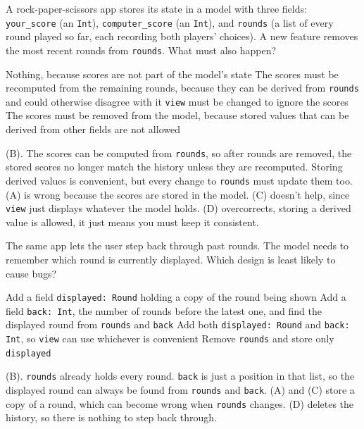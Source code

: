 \begin{blocksection}
\question A rock-paper-scissors app stores its state in a model with three fields: \lstinline$your_score$ (an \lstinline$Int$), \lstinline$computer_score$ (an \lstinline$Int$), and \lstinline$rounds$ (a list of every round played so far, each recording both players' choices). A new feature removes the most recent rounds from \lstinline$rounds$. What must also happen?

\begin{choices}
\choice Nothing, because scores are not part of the model's state
\choice The scores must be recomputed from the remaining rounds, because they can be derived from \lstinline$rounds$ and could otherwise disagree with it
\choice \lstinline$view$ must be changed to ignore the scores
\choice The scores must be removed from the model, because stored values that can be derived from other fields are not allowed
\end{choices}

\begin{solution}
(B). The scores can be computed from \lstinline$rounds$, so after rounds are removed, the stored scores no longer match the history unless they are recomputed. Storing derived values is convenient, but every change to \lstinline$rounds$ must update them too.
(A) is wrong because the scores are stored in the model.
(C) doesn't help, since \lstinline$view$ just displays whatever the model holds.
(D) overcorrects, storing a derived value is allowed, it just means you must keep it consistent.
\end{solution}
\end{blocksection}

\begin{blocksection}
\question The same app lets the user step back through past rounds. The model needs to remember which round is currently displayed. Which design is least likely to cause bugs?

\begin{choices}
\choice Add a field \lstinline$displayed: Round$ holding a copy of the round being shown
\choice Add a field \lstinline$back: Int$, the number of rounds before the latest one, and find the displayed round from \lstinline$rounds$ and \lstinline$back$
\choice Add both \lstinline$displayed: Round$ and \lstinline$back: Int$, so \lstinline$view$ can use whichever is convenient
\choice Remove \lstinline$rounds$ and store only \lstinline$displayed$
\end{choices}

\begin{solution}
(B). \lstinline$rounds$ already holds every round. \lstinline$back$ is just a position in that list, so the displayed round can always be found from \lstinline$rounds$ and \lstinline$back$.
(A) and (C) store a copy of a round, which can become wrong when \lstinline$rounds$ changes.
(D) deletes the history, so there is nothing to step back through.
\end{solution}
\end{blocksection}

